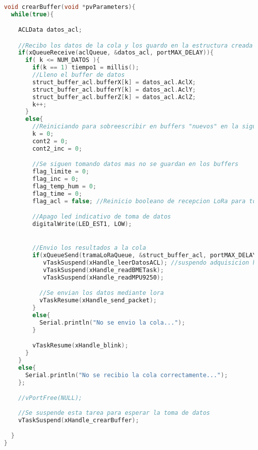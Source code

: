 \begin{lstlisting}[language=C++, caption=Creación de tareas en FreeRTOS]

void crearBuffer(void *pvParameters){
  while(true){

    ACLData datos_acl;

    //Recibo los datos de la cola y los guardo en la estructura creada
    if(xQueueReceive(aclQueue, &datos_acl, portMAX_DELAY)){
      if( k <= NUM_DATOS ){
        if(k == 1) tiempo1 = millis();
        //Lleno el buffer de datos
        struct_buffer_acl.bufferX[k] = datos_acl.AclX;
        struct_buffer_acl.bufferY[k] = datos_acl.AclY;
        struct_buffer_acl.bufferZ[k] = datos_acl.AclZ;
        k++;
      }
      else{
        //Reiniciando para sobreescribir en buffers "nuevos" en la siguiente accion
        k = 0;
        cont2 = 0;
        cont2_inc = 0;

        //Se siguen tomando datos mas no se guardan en los buffers
        flag_limite = 0;
        flag_inc = 0;
        flag_temp_hum = 0;
        flag_time = 0;
        flag_acl = false; //Reinicio booleano de recepcion LoRa para toma de decisiones en proxima peticion

        //Apago led indicativo de toma de datos
        digitalWrite(LED_EST1, LOW);


        //Envio los resultados a la cola
        if(xQueueSend(tramaLoRaQueue, &struct_buffer_acl, portMAX_DELAY)){
           vTaskSuspend(xHandle_leerDatosACL); //suspendo adquisicion hasta que se envie todo
           vTaskSuspend(xHandle_readBMETask);
           vTaskSuspend(xHandle_readMPU9250);

          //Se envian los datos mediante lora
          vTaskResume(xHandle_send_packet);
        }
        else{
          Serial.println("No se envio la cola...");
        }

        vTaskResume(xHandle_blink);
      }
    }
    else{
      Serial.println("No se recibio la cola correctamente...");
    };

    //vPortFree(NULL);
 
    //Se suspende esta tarea para esperar la toma de datos
    vTaskSuspend(xHandle_crearBuffer);

  }
}

\end{lstlisting}



